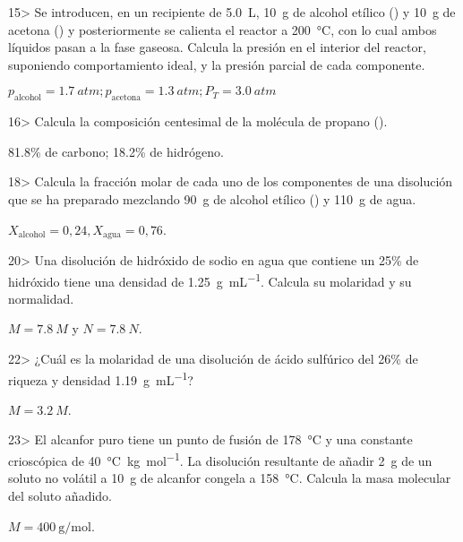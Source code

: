 \documentclass[11pt]{article}
\begin{document}
\begin{multicols}{2}
\begin{exercise}
  15> Se introducen, en un recipiente de \SI{5.0}{\liter}, \SI{10}{\gram} de alcohol etílico () y \SI{10}{\gram} de acetona () y posteriormente se calienta el reactor a \SI{200}{\celsius}, con lo cual
  ambos líquidos pasan a la fase gaseosa. Calcula la presión en el interior del reactor, suponiendo comportamiento ideal, y la presión parcial de cada componente.
\end{exercise}
\begin{solution}
  $p_\textrm{alcohol} = \SI{1.7}{atm}; p_\textrm{acetona} = \SI{1.3}{atm} ; P_T = \SI{3.0}{atm}$
\end{solution}

\begin{exercise}
  16> Calcula la composición centesimal de la molécula de propano ().
\end{exercise}
\begin{solution}
  \num{81,8}\% de carbono; \num{18,2}\% de hidrógeno.
\end{solution}

\begin{exercise}
  18> Calcula la fracción molar de cada uno de los componentes
  de una disolución que se ha preparado mezclando \SI{90}{\gram} de alcohol etílico () y \SI{110}{\gram} de agua.
\end{exercise}
\begin{solution}
  $X_\textrm{alcohol} = 0,24, X_\textrm{agua} = 0,76$.
\end{solution}

\begin{exercise}
  20> Una disolución de hidróxido de sodio en agua que contiene un 25\% de hidróxido tiene una densidad de \SI{1.25}{\gram\per\milli\liter}. Calcula
  su molaridad y su normalidad.
\end{exercise}
\begin{solution}
  $M = \SI{7.8}{M}$ y $N = \SI{7.8}{N}$.
\end{solution}

\begin{exercise}
  22> ¿Cuál es la molaridad de una disolución de ácido sulfúrico
  del 26\% de riqueza y densidad \SI{1.19}{\gram\per\milli\liter}?
\end{exercise}
\begin{solution}
  $M = \SI{3.2}{M}$.
\end{solution}

\begin{exercise}
  23> El alcanfor puro tiene un punto de fusión de \SI{178}{\celsius} y una constante crioscópica de \SI{40}{\celsius\kilo\gram\per\mole}. La disolución resultante de añadir \SI{2}{\gram} de un soluto no volátil a
  \SI{10}{\gram} de alcanfor congela a \SI{158}{\celsius}. Calcula la masa molecular del soluto añadido.
\end{exercise}
\begin{solution}
  $M = \SI{400}{\gram\per\mole}$.
\end{solution}


\end{multicols}
\end{document}
